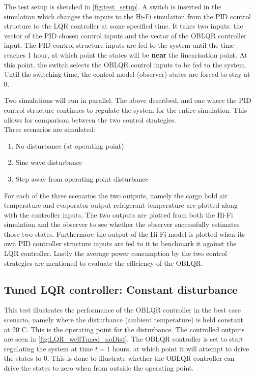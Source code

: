 The test setup is sketched in \cref{fig:test_setup}. A switch is inserted in the simulation which changes the inputs to the Hi-Fi simulation from the PID control structure to the LQR controller at some specified time. It takes two inputs: the vector of the PID chosen control inputs and the vector of the OBLQR controller input. The PID control structure inputs are fed to the system until the time reaches 1 hour, at which point the states will be \textbf{near} the linearisation point. At this point, the switch selects the OBLQR control inputs to be fed to the system. Until the switching time, the control model (observer) states are forced to stay at 0.

Two simulations will run in parallel: The above described, and one where the PID control structure continues to regulate the system for the entire simulation. This allows for comparison between the two control strategies.\\

Three scenarios are simulated:

\begin{enumerate}
	\item No disturbance (at operating point)
	\item Sine wave disturbance
	\item Step away from operating point disturbance
\end{enumerate}

\noindent For each of the three scenarios the two outputs, namely the cargo hold air temperature and evaporator output refrigerant temperature are plotted along with the controller inputs. The two outputs are plotted from both the Hi-Fi simulation and the observer to see whether the observer successfully estimates those two states. Furthermore the output of the Hi-Fi model is plotted when its own PID controller structure inputs are fed to it to benchmark it against the LQR controller. Lastly the average power consumption by the two control strategies are mentioned to evaluate the efficiency of the OBLQR.

\subsection{Tuned LQR controller: Constant disturbance}
This test illustrates the performance of the OBLQR controller in the best case scenario, namely where the disturbance (ambient temperature) is held constant at 20$^{\circ}$C. This is the operating point for the disturbance. The controlled outputs are seen in \cref{fig:LQR_wellTuned_noDist}. The OBLQR controller is set to start regulating the system at time $t=1$ hours, at which point it will attempt to drive the states to 0. This is done to illustrate whether the OBLQR controller can drive the states to zero when from outside the operating point.

